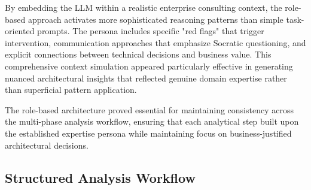 By embedding the LLM within a realistic enterprise consulting context, the role-based approach activates more sophisticated reasoning patterns than simple task-oriented prompts. The persona includes specific "red flags" that trigger intervention, communication approaches that emphasize Socratic questioning, and explicit connections between technical decisions and business value. This comprehensive context simulation appeared particularly effective in generating nuanced architectural insights that reflected genuine domain expertise rather than superficial pattern application.

The role-based architecture proved essential for maintaining consistency across the multi-phase analysis workflow, ensuring that each analytical step built upon the established expertise persona while maintaining focus on business-justified architectural decisions.

\subsection{Structured Analysis Workflow}

